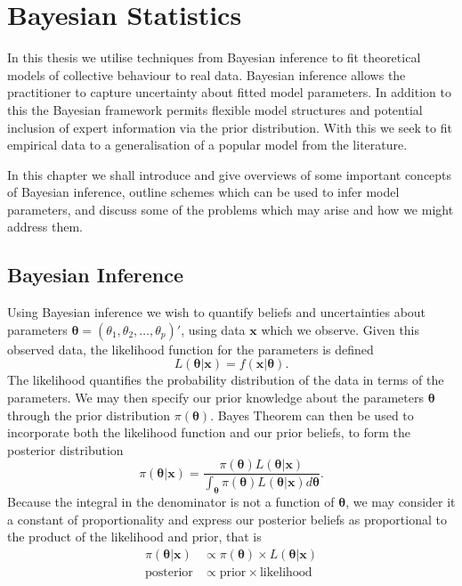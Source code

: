 \chapter{Bayesian Statistics}	
\label{cha:bayes_intro}
In this thesis we utilise techniques from Bayesian inference to fit theoretical models of collective behaviour to real data. Bayesian inference allows the practitioner to capture uncertainty about fitted model parameters. In addition to this the Bayesian framework permits flexible model structures and potential inclusion of expert information via the prior distribution. With this we seek to fit empirical data to a generalisation of a popular model from the literature.

In this chapter we shall introduce and give overviews of some important concepts of Bayesian inference, outline schemes which can be used to infer model parameters, and discuss some of the problems which may arise and how we might address them.

\section{Bayesian Inference}
\label{sec:bayesian_inference}
Using Bayesian inference we wish to quantify beliefs and uncertainties about parameters $\bm{\theta} = (\theta_1, \theta_2,\dots,\theta_p)'$, using data $\bm{x}$ which we observe. Given this observed data, the likelihood function for the parameters is defined
\[
    L(\bm{\theta}|\bm{x}) = f(\bm{x}|\bm{\theta}).
\]
The likelihood quantifies the probability distribution of the data in terms of the parameters. We may then specify our prior knowledge about the parameters $\bm{\theta}$ through the prior distribution $\pi(\bm{\theta})$. Bayes Theorem can then be used to incorporate both the likelihood function and our prior beliefs, to form the posterior distribution
\begin{equation}
\label{eq:bayes_theorem}
    \pi(\bm{\theta}|\bm{x}) = \frac{\pi({\bm{\theta}})L(\bm{\theta}|\bm{x})}{\int_{\bm{\theta}} \pi(\bm{\theta})L(\bm{\theta}|\bm{x})d\bm{\theta}}.
\end{equation}
Because the integral in the denominator is not a function of $\bm{\theta}$, we may consider it a constant of proportionality and express our posterior beliefs as proportional to the product of the likelihood and prior, that is
\begin{align*}
    \pi(\bm{\theta}|\bm{x}) &\propto \pi(\bm{\theta}) \times L(\bm{\theta}|\bm{x})\\
    \text{posterior} &\propto \text{prior} \times \text{likelihood}
\end{align*}

